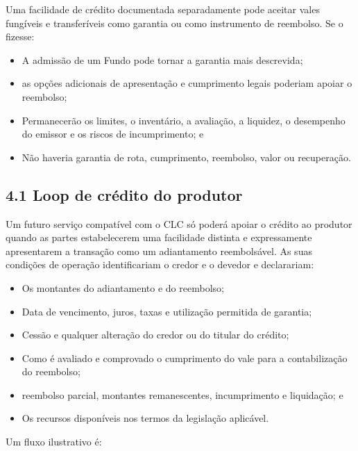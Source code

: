 \documentclass[11pt]{article}
\begin{document}
Uma facilidade de crédito documentada separadamente pode aceitar vales fungíveis e transferíveis como garantia ou como instrumento de reembolso. Se o fizesse:

\begin{itemize}[leftmargin=*]
\item A admissão de um Fundo pode tornar a garantia mais descrevida;
\item as opções adicionais de apresentação e cumprimento legais poderiam apoiar o reembolso;
\item Permanecerão os limites, o inventário, a avaliação, a liquidez, o desempenho do emissor e os riscos de incumprimento; e
\item Não haveria garantia de rota, cumprimento, reembolso, valor ou recuperação.
\end{itemize}
\subsection*{4.1 Loop de crédito do produtor}

Um futuro serviço compatível com o CLC só poderá apoiar o crédito ao produtor quando as partes estabelecerem uma facilidade distinta e expressamente apresentarem a transação como um adiantamento reembolsável. As suas condições de operação identificariam o credor e o devedor e declarariam:

\begin{itemize}[leftmargin=*]
\item Os montantes do adiantamento e do reembolso;
\item Data de vencimento, juros, taxas e utilização permitida de garantia;
\item Cessão e qualquer alteração do credor ou do titular do crédito;
\item Como é avaliado e comprovado o cumprimento do vale para a contabilização do reembolso;
\item reembolso parcial, montantes remanescentes, incumprimento e liquidação; e
\item Os recursos disponíveis nos termos da legislação aplicável.
\end{itemize}
Um fluxo ilustrativo é:
\end{document}
